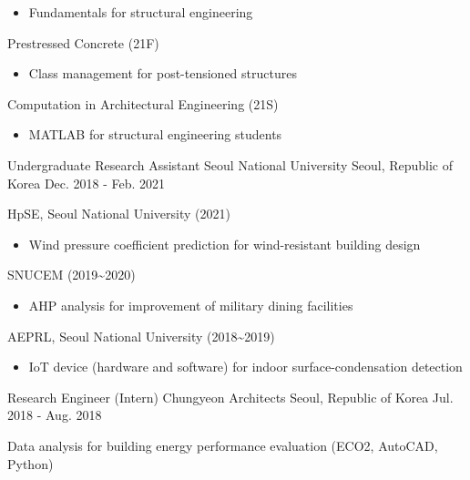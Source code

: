 \begin{cventries}
{\begin{cvitems}
        \begin{itemize}[leftmargin=2.5ex, nosep, noitemsep]
          \setlength{\parskip}{0pt}
          \item {Fundamentals for structural engineering}
        \end{itemize}
      \item {Prestressed Concrete (21F)}
        \begin{itemize}[leftmargin=2.5ex, nosep, noitemsep]
          \setlength{\parskip}{0pt}
          \item {Class management for post-tensioned structures}
        \end{itemize}
      \item {Computation in Architectural Engineering (21S)}
        \begin{itemize}[leftmargin=2.5ex, nosep, noitemsep]
          \setlength{\parskip}{0pt}
          \item {MATLAB for structural engineering students}
        \end{itemize}
    \end{cvitems}
  }

  \cventrydivider

  \cventrycompact
  {Undergraduate Research Assistant}
  {Seoul National University}
  {Seoul, Republic of Korea}
  {Dec. 2018 - Feb. 2021}
  {
    \begin{cvitems}
      \item {HpSE, Seoul National University (2021)}
        \begin{itemize}[leftmargin=2.5ex, nosep, noitemsep]
          \setlength{\parskip}{0pt}
          \item {Wind pressure coefficient prediction for wind-resistant building design}
        \end{itemize}
      \item {SNUCEM (2019\textasciitilde2020)}
        \begin{itemize}[leftmargin=2.5ex, nosep, noitemsep]
          \setlength{\parskip}{0pt}
          \item {AHP analysis for improvement of military dining facilities}
        \end{itemize}
      \item {AEPRL, Seoul National University (2018\textasciitilde2019)}
        \begin{itemize}[leftmargin=2.5ex, nosep, noitemsep]
          \setlength{\parskip}{0pt}
          \item {IoT device (hardware and software) for indoor surface-condensation detection}
        \end{itemize}
    \end{cvitems}
  }

  \cventrydivider

  \cventrycompact
  {Research Engineer (Intern)}
  {Chungyeon Architects}
  {Seoul, Republic of Korea}
  {Jul. 2018 - Aug. 2018}
  {
    \begin{cvitems}
      \item {Data analysis for building energy performance evaluation (ECO2, AutoCAD, Python)}
    \end{cvitems}
  }

\end{cventries}
